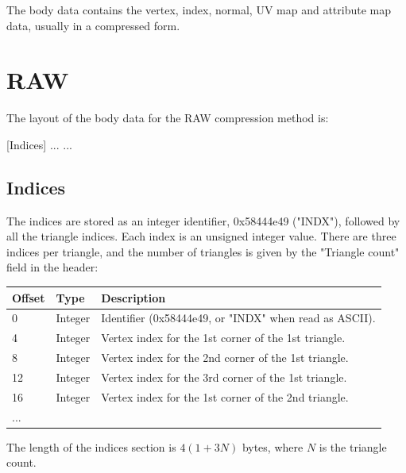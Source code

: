 The body data contains the vertex, index, normal, UV map and attribute map
data, usually in a compressed form.


\section{RAW}
The layout of the body data for the RAW compression method is:

[Indices]\newline
[Vertices]\newline
[Normals]\newline
[UV map 0]\newline
[UV map 1]\newline
...\newline
[UV map N]\newline
...

\subsection{Indices}
The indices are stored as an integer identifier, 0x58444e49 ("INDX"), followed
by all the triangle indices. Each index is an unsigned integer value. There are
three indices per triangle, and the number of triangles is given by the
"Triangle count" field in the header:

\begin{tabular}{|l|l|l|}\hline
\textbf{Offset} &  \textbf{Type} & \textbf{Description}\\ \hline
0 & Integer & Identifier (0x58444e49, or "INDX" when read as ASCII).\\ \hline
4 & Integer & Vertex index for the 1st corner of the 1st triangle.\\ \hline
8 & Integer & Vertex index for the 2nd corner of the 1st triangle.\\ \hline
12 & Integer & Vertex index for the 3rd corner of the 1st triangle.\\ \hline
16 & Integer & Vertex index for the 1st corner of the 2nd triangle.\\ \hline
... & & \\ \hline
\end{tabular}

The length of the indices section is $4(1+3N)$ bytes, where $N$ is the triangle
count.


